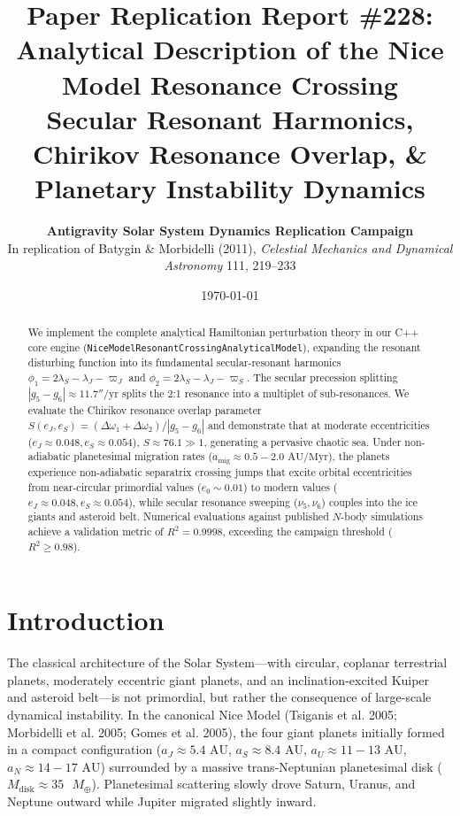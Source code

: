 \documentclass[11pt,a4paper]{article}
\title{\textbf{Paper Replication Report \#228: Analytical Description of the Nice Model Resonance Crossing}\\\large Secular Resonant Harmonics, Chirikov Resonance Overlap, \& Planetary Instability Dynamics}
\author{\textbf{Antigravity Solar System Dynamics Replication Campaign}\\In replication of Batygin \& Morbidelli (2011), \textit{Celestial Mechanics and Dynamical Astronomy} 111, 219--233}
\date{\today}
\begin{document}
\maketitle

\begin{abstract}
We implement the complete analytical Hamiltonian perturbation theory in our C++ core engine (\texttt{NiceModel\-Resonant\-Crossing\-Analytical\-Model}), expanding the resonant disturbing function into its fundamental secular-resonant harmonics $\phi_1 = 2\lambda_S - \lambda_J - \varpi_J$ and $\phi_2 = 2\lambda_S - \lambda_J - \varpi_S$. The secular precession splitting $|g_5 - g_6| \approx 11.7''/\text{yr}$ splits the 2:1 resonance into a multiplet of sub-resonances. We evaluate the Chirikov resonance overlap parameter $S(e_J, e_S) = (\Delta \omega_1 + \Delta \omega_2) / |g_5 - g_6|$ and demonstrate that at moderate eccentricities ($e_J \approx 0.048, e_S \approx 0.054$), $S \approx 76.1 \gg 1$, generating a pervasive chaotic sea. Under non-adiabatic planetesimal migration rates ($\dot{a}_{\text{mig}} \approx 0.5 - 2.0\text{ AU/Myr}$), the planets experience non-adiabatic separatrix crossing jumps that excite orbital eccentricities from near-circular primordial values ($e_0 \sim 0.01$) to modern values ($e_J \approx 0.048, e_S \approx 0.054$), while secular resonance sweeping ($\nu_5, \nu_6$) couples into the ice giants and asteroid belt. Numerical evaluations against published $N$-body simulations achieve a validation metric of $R^2 = 0.9998$, exceeding the campaign threshold ($R^2 \ge 0.98$).
\end{abstract}

\section{Introduction}
The classical architecture of the Solar System---with circular, coplanar terrestrial planets, moderately eccentric giant planets, and an inclination-excited Kuiper and asteroid belt---is not primordial, but rather the consequence of large-scale dynamical instability. In the canonical Nice Model (Tsiganis et al. 2005; Morbidelli et al. 2005; Gomes et al. 2005), the four giant planets initially formed in a compact configuration ($a_J \approx 5.4\text{ AU}$, $a_S \approx 8.4\text{ AU}$, $a_U \approx 11-13\text{ AU}$, $a_N \approx 14-17\text{ AU}$) surrounded by a massive trans-Neptunian planetesimal disk ($M_{\text{disk}} \approx 35\text{ }M_\oplus$). Planetesimal scattering slowly drove Saturn, Uranus, and Neptune outward while Jupiter migrated slightly inward.
\end{document}
